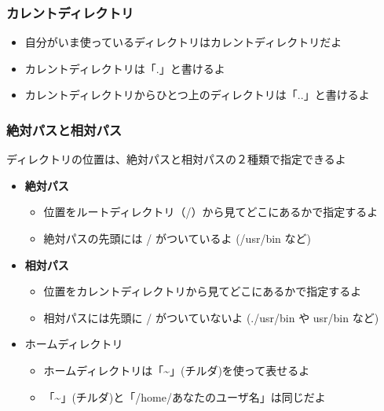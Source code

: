 \documentclass[slide03.tex]{subfiles}
\begin{document}
\begin{frame}
    \frametitle{カレントディレクトリ}
    \begin{itemize}
        \item 自分がいま使っているディレクトリはカレントディレクトリだよ
        \item カレントディレクトリは「.」と書けるよ
        \item カレントディレクトリからひとつ上のディレクトリは「..」と書けるよ
    \end{itemize}
\end{frame}

\begin{frame}
    \frametitle{絶対パスと相対パス}
    \vspace{1em}
    ディレクトリの位置は、絶対パスと相対パスの２種類で指定できるよ\\
    \begin{itemize}
        \item {\bf 絶対パス}
        \begin{itemize}
            \item 位置をルートディレクトリ（/）から見てどこにあるかで指定するよ
            \item 絶対パスの先頭には / がついているよ (/usr/bin など)
        \end{itemize}
        \item {\bf 相対パス}
        \begin{itemize}
            \item 位置をカレントディレクトリから見てどこにあるかで指定するよ
            \item 相対パスには先頭に / がついていないよ (./usr/bin や usr/bin など)
        \end{itemize}
        \item ホームディレクトリ
        \begin{itemize}
            \item ホームディレクトリは「\textasciitilde」(チルダ)を使って表せるよ
            \item 「\textasciitilde」(チルダ)と「/home/あなたのユーザ名」は同じだよ
        \end{itemize}
    \end{itemize}
\end{frame}
\end{document}
